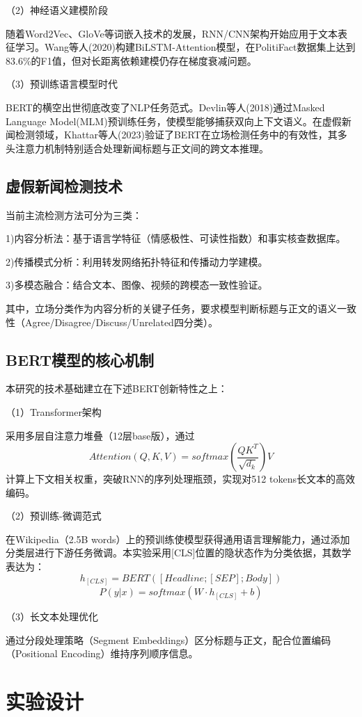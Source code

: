 \documentclass{cjc}
\begin{document}
（2）神经语义建模阶段

随着Word2Vec、GloVe等词嵌入技术的发展，RNN/CNN架构开始应用于文本表征学习。Wang等人(2020)构建BiLSTM-Attention模型，在PolitiFact数据集上达到83.6\%的F1值，但对长距离依赖建模仍存在梯度衰减问题。

（3）预训练语言模型时代

BERT的横空出世彻底改变了NLP任务范式。Devlin等人(2018)通过Masked Language Model(MLM)预训练任务，使模型能够捕获双向上下文语义。在虚假新闻检测领域，Khattar等人(2023)验证了BERT在立场检测任务中的有效性，其多头注意力机制特别适合处理新闻标题与正文间的跨文本推理。

\subsection{虚假新闻检测技术}

当前主流检测方法可分为三类：

1)内容分析法：基于语言学特征（情感极性、可读性指数）和事实核查数据库。

2)传播模式分析：利用转发网络拓扑特征和传播动力学建模。

3)多模态融合：结合文本、图像、视频的跨模态一致性验证。

其中，立场分类作为内容分析的关键子任务，要求模型判断标题与正文的语义一致性（Agree/Disagree/Discuss/Unrelated四分类）。

\subsection{BERT模型的核心机制}

本研究的技术基础建立在下述BERT创新特性之上：

（1）Transformer架构

采用多层自注意力堆叠（12层base版），通过
$$Attention(Q,K,V)=softmax(\frac{QK^T}{\sqrt{d_k}})V$$
计算上下文相关权重，突破RNN的序列处理瓶颈，实现对512 tokens长文本的高效编码。

（2）预训练-微调范式

在Wikipedia（2.5B words）上的预训练使模型获得通用语言理解能力，通过添加分类层进行下游任务微调。本实验采用[CLS]位置的隐状态作为分类依据，其数学表达为：
$$h_{[CLS]} = BERT([Headline; [SEP]; Body])$$
$$P(y|x) = softmax(W \cdot h_{[CLS]} + b)$$

（3）长文本处理优化

通过分段处理策略（Segment Embeddings）区分标题与正文，配合位置编码（Positional Encoding）维持序列顺序信息。

\section{实验设计}
\end{document}
